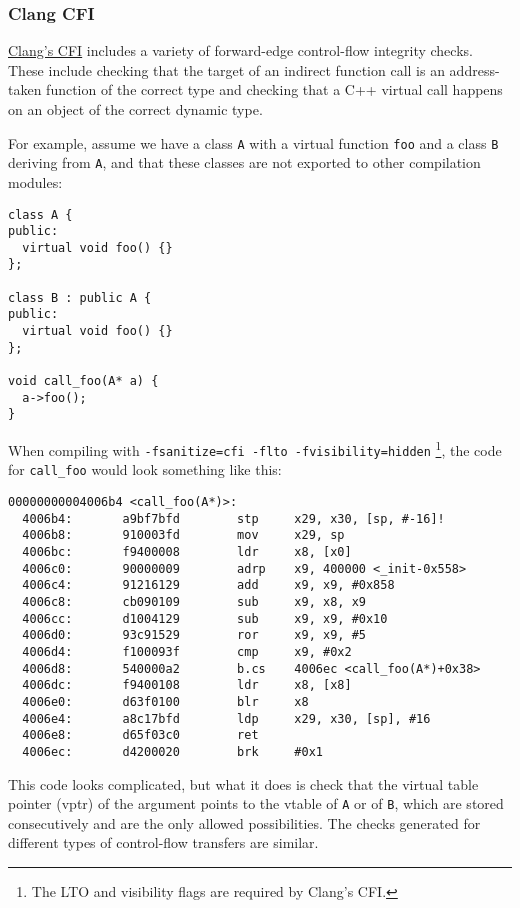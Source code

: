 \documentclass[
  a4paper,
]{report}
\begin{document}
\hypertarget{clang-cfi}{%
\subsubsection{Clang CFI}\label{clang-cfi}}

\href{https://clang.llvm.org/docs/ControlFlowIntegrity.html}{Clang's
CFI} includes a variety of forward-edge control-flow integrity checks.
These include checking that the target of an indirect function call is
an address-taken function of the correct type and checking that a C++
 virtual call happens on an object of the correct dynamic
type.

For example, assume we have a class \texttt{A} with a virtual function
\texttt{foo} and a class \texttt{B} deriving from \texttt{A}, and that
these classes are not exported to other compilation modules:

\begin{verbatim}
class A {
public:
  virtual void foo() {}
};

class B : public A {
public:
  virtual void foo() {}
};

void call_foo(A* a) {
  a->foo();
}
\end{verbatim}

When compiling with \texttt{-fsanitize=cfi\ -flto\ -fvisibility=hidden}
\footnote{The LTO and visibility flags are required by Clang's CFI.},
the code for \texttt{call\_foo} would look something like this:

\begin{verbatim}
00000000004006b4 <call_foo(A*)>:
  4006b4:       a9bf7bfd        stp     x29, x30, [sp, #-16]!
  4006b8:       910003fd        mov     x29, sp
  4006bc:       f9400008        ldr     x8, [x0]
  4006c0:       90000009        adrp    x9, 400000 <_init-0x558>
  4006c4:       91216129        add     x9, x9, #0x858
  4006c8:       cb090109        sub     x9, x8, x9
  4006cc:       d1004129        sub     x9, x9, #0x10
  4006d0:       93c91529        ror     x9, x9, #5
  4006d4:       f100093f        cmp     x9, #0x2
  4006d8:       540000a2        b.cs    4006ec <call_foo(A*)+0x38>
  4006dc:       f9400108        ldr     x8, [x8]
  4006e0:       d63f0100        blr     x8
  4006e4:       a8c17bfd        ldp     x29, x30, [sp], #16
  4006e8:       d65f03c0        ret
  4006ec:       d4200020        brk     #0x1
\end{verbatim}

This code looks complicated, but what it does is check that the virtual
table pointer (vptr) of the argument points to the vtable of \texttt{A}
or of \texttt{B}, which are stored consecutively and are the only
allowed possibilities. The checks generated for different types of
control-flow transfers are similar.
\end{document}
